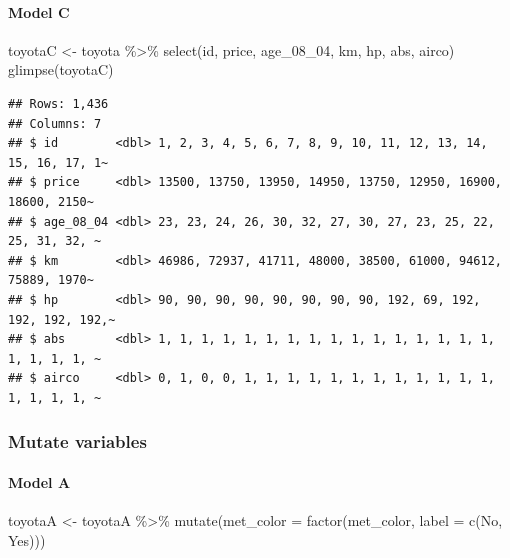 \documentclass[
]{article}
\newenvironment{Shaded}{\begin{snugshade}}{\end{snugshade}}
\newcommand{\AttributeTok}[1]{\textcolor[rgb]{0.77,0.63,0.00}{#1}}
\newcommand{\FunctionTok}[1]{\textcolor[rgb]{0.00,0.00,0.00}{#1}}
\newcommand{\NormalTok}[1]{#1}
\newcommand{\OtherTok}[1]{\textcolor[rgb]{0.56,0.35,0.01}{#1}}
\newcommand{\SpecialCharTok}[1]{\textcolor[rgb]{0.00,0.00,0.00}{#1}}
\newcommand{\StringTok}[1]{\textcolor[rgb]{0.31,0.60,0.02}{#1}}
\begin{document}
\hypertarget{model-c-1}{%
\paragraph{Model C}\label{model-c-1}}

\begin{Shaded}
\begin{Highlighting}[]
\NormalTok{toyotaC }\OtherTok{\textless{}{-}}\NormalTok{ toyota }\SpecialCharTok{\%\textgreater{}\%} 
  \FunctionTok{select}\NormalTok{(id, price, age\_08\_04, km, hp, abs, airco)}
\FunctionTok{glimpse}\NormalTok{(toyotaC)}
\end{Highlighting}
\end{Shaded}

\begin{verbatim}
## Rows: 1,436
## Columns: 7
## $ id        <dbl> 1, 2, 3, 4, 5, 6, 7, 8, 9, 10, 11, 12, 13, 14, 15, 16, 17, 1~
## $ price     <dbl> 13500, 13750, 13950, 14950, 13750, 12950, 16900, 18600, 2150~
## $ age_08_04 <dbl> 23, 23, 24, 26, 30, 32, 27, 30, 27, 23, 25, 22, 25, 31, 32, ~
## $ km        <dbl> 46986, 72937, 41711, 48000, 38500, 61000, 94612, 75889, 1970~
## $ hp        <dbl> 90, 90, 90, 90, 90, 90, 90, 90, 192, 69, 192, 192, 192, 192,~
## $ abs       <dbl> 1, 1, 1, 1, 1, 1, 1, 1, 1, 1, 1, 1, 1, 1, 1, 1, 1, 1, 1, 1, ~
## $ airco     <dbl> 0, 1, 0, 0, 1, 1, 1, 1, 1, 1, 1, 1, 1, 1, 1, 1, 1, 1, 1, 1, ~
\end{verbatim}

\hypertarget{mutate-variables}{%
\subsubsection{Mutate variables}\label{mutate-variables}}

\hypertarget{model-a-2}{%
\paragraph{Model A}\label{model-a-2}}

\begin{Shaded}
\begin{Highlighting}[]
\NormalTok{toyotaA }\OtherTok{\textless{}{-}}\NormalTok{ toyotaA }\SpecialCharTok{\%\textgreater{}\%} 
  \FunctionTok{mutate}\NormalTok{(}\AttributeTok{met\_color =} \FunctionTok{factor}\NormalTok{(met\_color,}
                              \AttributeTok{label =} \FunctionTok{c}\NormalTok{(}\StringTok{\textquotesingle{}No\textquotesingle{}}\NormalTok{, }\StringTok{\textquotesingle{}Yes\textquotesingle{}}\NormalTok{)))}
\end{Highlighting}
\end{Shaded}
\end{document}
